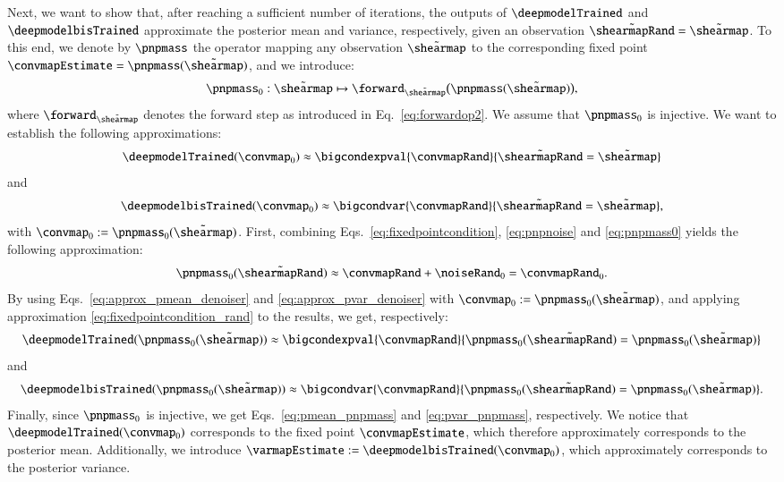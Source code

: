 \documentclass{aa}
\begin{document}
Next, we want to show that, after reaching a sufficient number of iterations, the outputs of $\deepmodelTrained$ and $\deepmodelbisTrained$ approximate the posterior mean and variance, respectively, given an observation $\tilde\shearmapRand = \tilde\shearmap$. To this end, we denote by $\pnpmass$ the operator mapping any observation $\tilde\shearmap$ to the corresponding fixed point $\convmapEstimate = \pnpmass(\tilde\shearmap)$, and we introduce:
\begin{equation}
    \pnpmass_0: \tilde\shearmap \mapsto \forward_{\tilde\shearmap}\bigl(
        \pnpmass(\tilde\shearmap)
    \bigr),
\label{eq:pnpmass0}
\end{equation}
where $\forward_{\tilde\shearmap}$ denotes the forward step as introduced in Eq.~\eqref{eq:forwardop2}. We assume that $\pnpmass_0$ is injective.
We want to establish the following approximations:
\begin{equation}
    \deepmodelTrained(\convmap_0) \approx \bigcondexpval{\convmapRand}{\tilde\shearmapRand=\tilde\shearmap}
\label{eq:pmean_pnpmass}
\end{equation}
and
\begin{equation}
    \deepmodelbisTrained(\convmap_0) \approx \bigcondvar{\convmapRand}{\tilde\shearmapRand=\tilde\shearmap},
\label{eq:pvar_pnpmass}
\end{equation}
with $\convmap_0 := \pnpmass_0(\tilde\shearmap)$.
First, combining Eqs.~\eqref{eq:fixedpointcondition}, \eqref{eq:pnpnoise} and \eqref{eq:pnpmass0} yields the following approximation:
\begin{equation}
    \pnpmass_0(\tilde\shearmapRand) \approx \convmapRand + \noiseRand_0 = \convmapRand_0.
\label{eq:fixedpointcondition_rand}
\end{equation}
By using Eqs.~\eqref{eq:approx_pmean_denoiser} and \eqref{eq:approx_pvar_denoiser} with $\convmap_0 := \pnpmass_0(\tilde\shearmap)$, and applying approximation \eqref{eq:fixedpointcondition_rand} to the results, we get, respectively:
\begin{equation}
    \deepmodelTrained(\pnpmass_0(\tilde\shearmap)) \approx \bigcondexpval{\convmapRand}{\pnpmass_0(\tilde\shearmapRand)=\pnpmass_0(\tilde\shearmap)}
\end{equation}
and
\begin{equation}
    \deepmodelbisTrained(\pnpmass_0(\tilde\shearmap)) \approx \bigcondvar{\convmapRand}{\pnpmass_0(\tilde\shearmapRand)=\pnpmass_0(\tilde\shearmap)}.
\end{equation}
Finally, since $\pnpmass_0$ is injective, we get Eqs.~\eqref{eq:pmean_pnpmass} and \eqref{eq:pvar_pnpmass}, respectively. We notice that $\deepmodelTrained(\convmap_0)$ corresponds to the fixed point $\convmapEstimate$, which therefore approximately corresponds to the posterior mean. Additionally, we introduce $\varmapEstimate := \deepmodelbisTrained(\convmap_0)$, which approximately corresponds to the posterior variance.
\end{document}
